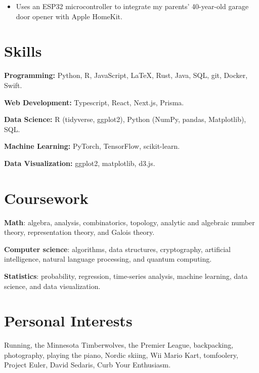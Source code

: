 \documentclass{resume}
\begin{document}

\begin{itemize}
	\item Uses an ESP32 microcontroller to integrate my parents' 40-year-old garage door opener with Apple HomeKit.
\end{itemize}

\section{Skills}

\textbf{Programming:} Python, R, JavaScript, \LaTeX, Rust, Java, SQL, git, Docker, Swift.

\textbf{Web Development:} Typescript, React, Next.js, Prisma.

\textbf{Data Science:} R (tidyverse, ggplot2), Python (NumPy, pandas, Matplotlib), SQL.

\textbf{Machine Learning:} PyTorch, TensorFlow, scikit-learn.

\textbf{Data Visualization:} ggplot2, matplotlib, d3.js.

\section{Coursework}

\textbf{Math}:
algebra, analysis, combinatorics, topology, analytic and algebraic number theory, representation theory, and Galois theory.

\textbf{Computer science}:
algorithms, data structures, cryptography, artificial intelligence, natural language processing, and quantum computing.

\textbf{Statistics}:
probability, regression, time-series analysis, machine learning, data science, and data visualization.

\section{Personal Interests}

Running, the Minnesota Timberwolves, the Premier League, backpacking, photography, playing the piano, Nordic skiing, Wii Mario Kart, tomfoolery, Project Euler, David Sedaris, Curb Your Enthusiasm.
\end{document}
